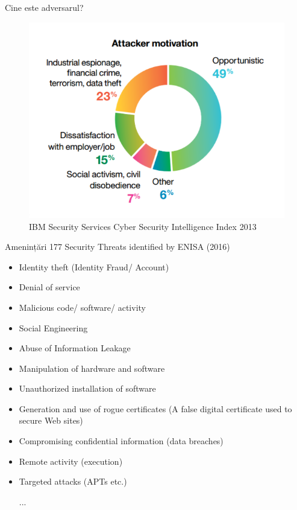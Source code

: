 \documentclass[pdf]{beamer}
\begin{document}
\begin{frame}{Cine este adversarul?}
\begin{figure}[t]
\centering
\includegraphics[scale=0.5]{Images/attacker-motivation}
\caption{IBM Security Services Cyber Security Intelligence Index 2013}
\end{figure}
\end{frame}



\begin{frame}{Amenințări}
177 Security Threats identified by ENISA (2016)
\begin{itemize}
\item
Identity theft (Identity Fraud/ Account)
\item
Denial of service
\item
Malicious code/ software/ activity
\item
Social Engineering
\item
Abuse of Information Leakage
\item
Manipulation of hardware and software
\item
Unauthorized installation of software
\item
Generation and use of rogue certificates (A false digital certificate used to secure Web sites)
\item
Compromising confidential information (data breaches)
\item
Remote activity (execution)
\item
Targeted attacks (APTs etc.)

...
\end{itemize}
\end{frame}
\end{document}
